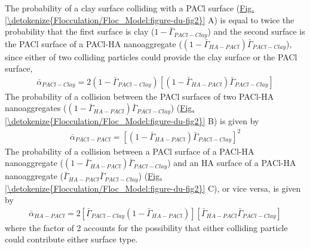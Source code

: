 \documentclass[letterpaper,10pt,english]{sphinxmanual}
\begin{document}
The probability of a clay surface colliding with a PACl surface (\hyperref[\detokenize{Flocculation/Floc_Model:figure-du-fig2}]{Fig.\@ \ref{\detokenize{Flocculation/Floc_Model:figure-du-fig2}}} A) is equal to twice the probability that the first surface is clay (\(1-{\bar{\Gamma}}_{PACl-Clay}\)) and the second surface is the PACl surface of a PACl-HA nanoaggregate (\(\left(1-{\bar{\Gamma}}_{HA-PACl}\right){\bar{\Gamma}}_{PACl-Clay}\)), since either of two colliding particles could provide the clay surface or the PACl surface,
\begin{equation}\label{equation:Flocculation/Floc_Model:Flocculation/Floc_Model:20}
\begin{split}{\bar{\alpha }}_{PACl-Clay}=2\left(1-{\bar{\Gamma}}_{PACl-Clay}\right)\left[\left(1-{\bar{\Gamma}}_{HA-PACl}\right){\bar{\Gamma}}_{PACl-Clay}\right]\end{split}
\end{equation}
The probability of a collision between the PACl surfaces of two PACl-HA nanoaggregates (\(\left(1-{\bar{\Gamma}}_{HA-PACl}\right){\bar{\Gamma}}_{PACl-Clay}\)) (\hyperref[\detokenize{Flocculation/Floc_Model:figure-du-fig2}]{Fig.\@ \ref{\detokenize{Flocculation/Floc_Model:figure-du-fig2}}} B) is given by
\begin{equation}\label{equation:Flocculation/Floc_Model:Flocculation/Floc_Model:21}
\begin{split}{\bar{\alpha}}_{PACl-PACl}={\left[\left(1-{\bar{\Gamma}}_{HA-PACl}\right){\bar{\Gamma}}_{PACl-Clay}\right]}^2\end{split}
\end{equation}
The probability of a collision between a PACl surface of a PACl-HA nanoaggregate (\(\left(1-{\bar{\Gamma}}_{HA-PACl}\right){\bar{\Gamma}}_{PACl-Clay}\)) and an HA surface of a PACl-HA nanoaggregate (\({\bar{\Gamma}}_{HA-PACl}{\bar{\Gamma}}_{PACl-Clay}\)) (\hyperref[\detokenize{Flocculation/Floc_Model:figure-du-fig2}]{Fig.\@ \ref{\detokenize{Flocculation/Floc_Model:figure-du-fig2}}} C), or vice versa, is given by
\begin{equation}\label{equation:Flocculation/Floc_Model:Flocculation/Floc_Model:22}
\begin{split}{\bar{\alpha }}_{HA-PACl}=2\left[{\bar{\Gamma}}_{PACl-Clay}\left(1-{\bar{\Gamma}}_{HA-PACl}\right)\right]\left[{\bar{\Gamma}}_{HA-PACl}{\bar{\Gamma}}_{PACl-Clay}\right]\end{split}
\end{equation}
where the factor of 2 accounts for the possibility that either colliding particle could contribute either surface type.
\end{document}
